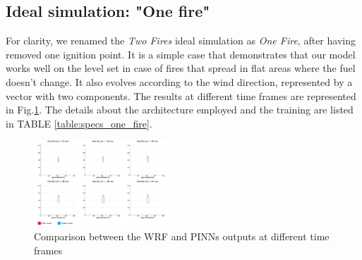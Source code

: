 \documentclass{juliacon}
\begin{document}
\subsection{Ideal simulation: "One fire"}
For clarity, we renamed the \textit{Two Fires} ideal simulation as \textit{One Fire}, after having removed one ignition point. It is a simple case that demonstrates that our model works well on the level set in case of fires that spread in flat areas where the fuel doesn't change. It also evolves according to the wind direction, represented by a vector with two components. The results at different time frames are represented in Fig.\ref{fig:one_fire_sequence}.
The details about the architecture employed and the training are listed in TABLE \ref{table:specs_one_fire}.


\begin{table}
\end{table}



\begin{figure}[t]
\centering
\includegraphics[width=0.45\textwidth]{images/one_fire_results/One Fire sequence.pdf}
\caption{Comparison between the WRF and PINNs outputs at different time frames}
\label{fig:one_fire_sequence}
\end{figure}
\end{document}
